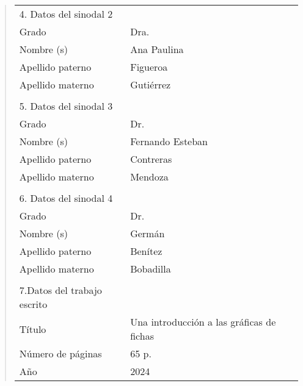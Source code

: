 {\begin{quote}
\begin{tabular}{lll}
4. Datos del sinodal 2      & {}                                          \\
Grado                       & Dra.                                          \\
Nombre (s)                   & Ana Paulina                                     \\
Apellido paterno            & Figueroa                                     \\
Apellido materno            & Guti\'errez                                 \\
{}                          & {}                                          \\
5. Datos del sinodal 3      & {}                                          \\
Grado                       & Dr.                                        \\
Nombre (s)                   & Fernando Esteban                           \\
Apellido paterno            & Contreras                                     \\
Apellido materno            & Mendoza                                     \\
{}                          & {}                                          \\
6. Datos del sinodal 4      & {}                                          \\
Grado                       & Dr.                                          \\
Nombre (s)                   & Germ\'an                                     \\
Apellido paterno            & Ben\'itez                                     \\
Apellido materno            & Bobadilla                                     \\
{}                          & {}                                          \\
7.Datos del trabajo escrito & {}                                          \\
T\'itulo                    & Una introducci\'on a las gr\'aficas de fichas  \\
N\'umero de p\'aginas       & 65 p.                                       \\
A\~no                       & 2024                                        \\
\end{tabular}
\end{quote}
}
